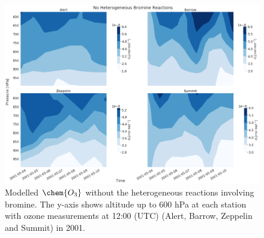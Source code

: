 \begin{figure}
    \centering
    \includegraphics[width = \linewidth]{Chapter6_Results/images/noBr_2001_o3.png}
    \caption{Modelled $\chem{O_3}$ without the heterogeneous reactions involving bromine. The y-axis shows altitude up to 600 hPa at each station with ozone measurements at 12:00 (UTC) (Alert, Barrow, Zeppelin and Summit) in 2001.}
    \label{fig:vert_noBr_o3_2001}
\end{figure}